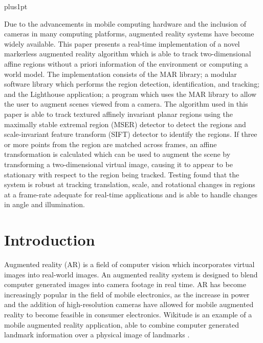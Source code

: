 \documentclass[oneside,11pt]{Latex/Classes/PhDthesisPSnPDF}
\begin{document}


\renewcommand\baselinestretch{1.2}
\baselineskip=18pt plus1pt

\begin{abstracts}
Due to the advancements in mobile computing hardware and the inclusion of cameras in many computing platforms, augmented reality systems have become widely available.  This paper presents a real-time implementation of a novel markerless augmented reality algorithm which is able to track two-dimensional affine regions without a priori information of the environment or computing a world model.  The implementation consists of the MAR library; a modular software library which performs the region detection, identification, and tracking; and the Lighthouse application; a program which uses the MAR library to allow the user to augment scenes viewed from a camera.  The algorithm used in this paper is able to track textured affinely invariant planar regions using the maximally stable extremal region (MSER) detector to detect the regions and scale-invariant feature transform (SIFT) detector to identify the regions.  If three or more points from the region are matched across frames, an affine transformation is calculated which can be used to augment the scene by transforming a two-dimensional virtual image, causing it to appear to be stationary with respect to the region being tracked.  Testing found that the system is robust at tracking translation, scale, and rotational changes in regions at a frame-rate adequate for real-time applications and is able to handle changes in angle and illumination.   
\end{abstracts}

\frontmatter

\setcounter{secnumdepth}{3}
\setcounter{tocdepth}{3}
\tableofcontents

\listoffigures
\listoftables

\mainmatter

\chapter{Introduction}

Augmented reality (AR) is a field of computer vision which incorporates virtual images into real-world images.  An augmented reality system is designed to blend computer generated images into camera footage in real time.  AR has become increasingly popular in the field of mobile electronics, as the increase in power and the addition of high-resolution cameras have allowed for mobile augmented reality to become feasible in consumer electronics.  Wikitude is an example of a mobile augmented reality application, able to combine computer generated landmark information over a physical image of landmarks \cite{wikitude_11}.
\end{document}
